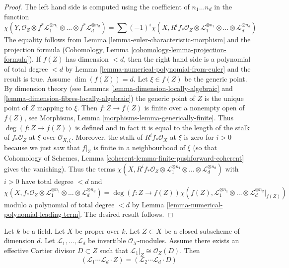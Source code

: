 \begin{proof}
The left hand side is computed using the coefficient of $n_1 \ldots n_d$
in the function
$$
\chi(Y, \mathcal{O}_Z \otimes f^*\mathcal{L}_1^{\otimes n_1} \otimes
\ldots \otimes f^*\mathcal{L}_d^{\otimes n_d}) =
\sum (-1)^i
\chi(X, R^if_*\mathcal{O}_Z \otimes
\mathcal{L}_1^{\otimes n_1} \otimes \ldots \otimes
\mathcal{L}_d^{\otimes n_d})
$$
The equality follows from Lemma \ref{lemma-euler-characteristic-morphism}
and the projection formula
(Cohomology, Lemma \ref{cohomology-lemma-projection-formula}).
If $f(Z)$ has dimension $< d$, then the right hand side
is a polynomial of total degree $< d$ by
Lemma \ref{lemma-numerical-polynomial-from-euler}
and the result is true. Assume $\dim(f(Z)) = d$. Let
$\xi \in f(Z)$ be the generic point. By
dimension theory (see Lemmas \ref{lemma-dimension-locally-algebraic} and
\ref{lemma-dimension-fibres-locally-algebraic})
the generic point of $Z$ is the unique point of $Z$ mapping to $\xi$.
Then $f : Z \to f(Z)$ is finite over a nonempty open of $f(Z)$, see
Morphisms, Lemma \ref{morphisms-lemma-generically-finite}.
Thus $\deg(f : Z \to f(Z))$ is defined and in fact it is equal
to the length of the stalk of $f_*\mathcal{O}_Z$ at $\xi$
over $\mathcal{O}_{X, \xi}$. Moreover, the stalk of
$R^if_*\mathcal{O}_X$ at $\xi$ is zero for $i > 0$ because
we just saw that $f|_Z$ is finite in a neighbourhood of $\xi$
(so that Cohomology of Schemes, Lemma
\ref{coherent-lemma-finite-pushforward-coherent} gives the vanishing).
Thus the terms $\chi(X, R^if_*\mathcal{O}_Z \otimes
\mathcal{L}_1^{\otimes n_1} \otimes \ldots \otimes
\mathcal{L}_d^{\otimes n_d})$ with $i > 0$ have total
degree $< d$ and
$$
\chi(X, f_*\mathcal{O}_Z \otimes
\mathcal{L}_1^{\otimes n_1} \otimes \ldots \otimes
\mathcal{L}_d^{\otimes n_d})
=
\deg(f : Z \to f(Z)) \chi(f(Z),
\mathcal{L}_1^{\otimes n_1} \otimes \ldots \otimes
\mathcal{L}_d^{\otimes n_d}|_{f(Z)})
$$
modulo a polynomial of total degree $< d$ by
Lemma \ref{lemma-numerical-polynomial-leading-term}.
The desired result follows.
\end{proof}

\begin{lemma}
\label{lemma-numerical-intersection-effective-Cartier-divisor}
Let $k$ be a field. Let $X$ be proper over $k$. Let $Z \subset X$ be
a closed subscheme of dimension $d$. Let $\mathcal{L}_1, \ldots, \mathcal{L}_d$
be invertible $\mathcal{O}_X$-modules. Assume there exists an
effective Cartier divisor $D \subset Z$ such that
$\mathcal{L}_1|_Z \cong \mathcal{O}_Z(D)$. Then
$$
(\mathcal{L}_1 \cdots \mathcal{L}_d \cdot Z) =
(\mathcal{L}_2 \cdots \mathcal{L}_d \cdot D)
$$
\end{lemma}

